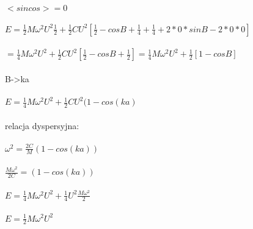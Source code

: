 $<sin cos>=0$
\\
\\
$E=\frac{1}{2}M\omega^2U^2\frac{1}{2}+\frac{1}{2}CU^2[\frac{1}{2}-cosB+\frac{1}{4}+\frac{1}{4}+2*0*sinB-2*0*0]$
\\
\\
$=\frac{1}{4}M\omega^2U^2+\frac{1}{2}CU^2[\frac{1}{2}-cosB+\frac{1}{2}]=\frac{1}{4}M\omega^2U^2+\frac{1}{2}[1-cosB]$
\\
\\
B->ka
\\
\\
$E=\frac{1}{4}M\omega^2U^2+\frac{1}{2}CU^2(1-cos(ka)$
\\
\\
relacja dyspersyjna:
\\
\\
$\omega^2=\frac{2C}{M}(1-cos(ka))$
\\
\\
$\frac{M\omega^2}{2C}=(1-cos(ka))$
\\
\\
$E=\frac{1}{4}M\omega^2U^2+\frac{1}{4}U^2\frac{M\omega^2}{2}$
\\
\\
$E=\frac{1}{2}M\omega^2U^2$\hrulefill
